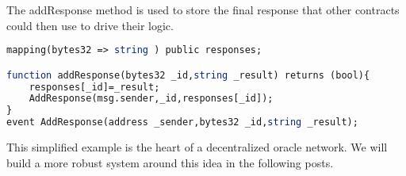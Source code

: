 \documentclass[a4paper,10pt]{article}
\begin{document}
The addResponse method is used to store the final response that other contracts could then use to drive their logic.\\

\begin{lstlisting}[language=Scilab]
mapping(bytes32 => string ) public responses;

function addResponse(bytes32 _id,string _result) returns (bool){
    responses[_id]=_result;
    AddResponse(msg.sender,_id,responses[_id]);
}
event AddResponse(address _sender,bytes32 _id,string _result);
\end{lstlisting}

This simplified example is the heart of a decentralized oracle network. We will build a more robust system around this idea in the following posts.\\
\end{document}
